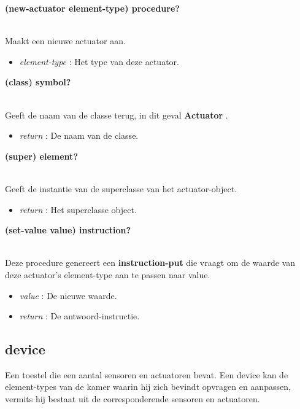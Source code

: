 \documentclass{article}
\newcommand{\ar}{\ding{213} }
\newcommand{\code}[1]{\textcolor{code}{#1}}
\newcommand{\lb}[1][]{\code{(#1}}
\newcommand{\rb}{\code{)}}
\newcommand{\racket}[1]{
	{\color{blue}\textbf{#1}}
}
\begin{document}
\begin{framed}
\hypertarget{actuator:new-actuator}{\racket{\lb[new-actuator] element-type\rb \ar \code{procedure?}}}
\\Maakt een nieuwe actuator aan.
\begin{itemize}
	\item \emph{element-type} : Het type van deze actuator.
\end{itemize}
\end{framed}

\begin{framed}
\hypertarget{actuator:class}{\racket{\lb[class]\rb \ar \code{symbol?}}}
\\Geeft de naam van de classe terug, in dit geval \racket{Actuator}.
\begin{itemize}
	\item \emph{return} : De naam van de classe.
\end{itemize}
\end{framed}

\begin{framed}
\hypertarget{actuator:super}{\racket{\lb[super]\rb \ar \code{element?}}}
\\Geeft de instantie van de superclasse van het actuator-object.
\begin{itemize}
	\item \emph{return} : Het superclasse object.
\end{itemize}
\end{framed}

\begin{framed}
\hypertarget{actuator:set-value}{\racket{\lb[set-value] value\rb \ar \code{instruction?}}}
\\Deze procedure genereert een \racket{instruction-put} die vraagt om de waarde van deze actuator's element-type aan te passen naar value.
\begin{itemize}
	\item \emph{value} : De nieuwe waarde.
	\item \emph{return} : De antwoord-instructie.
\end{itemize}
\end{framed}

\newpage
\hypertarget{device}{\subsection{device}}
Een toestel die een aantal sensoren en actuatoren bevat. Een device kan de element-types van de kamer waarin hij zich bevindt opvragen en aanpassen, vermits hij bestaat uit de corresponderende sensoren en actuatoren.
\end{document}
